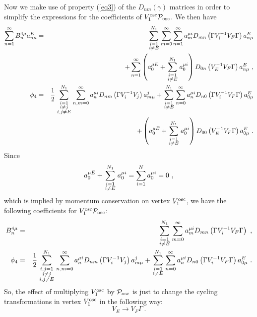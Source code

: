 \documentclass[a4paper,11pt]{article}
\begin{document}
Now we make use of property (\ref{eq3}) of the $D_{nm}(\gamma )$ matrices in order to simplify the expressions for the coefficients of $V^{\rm osc}_1{\cal P}_{\rm osc}$. We then have
\begin{eqnarray}
\sum_{n=1}^\infty B^{4\mu }_na^E_{n\mu } & = & \sum_{\scriptstyle i=1\atop \scriptstyle i\neq E}^{N_1}\sum_{m=0}^\infty \sum_{n=1}^\infty a^{\mu i}_mD_{mn}\left( \Gamma V^{-1}_iV_F\Gamma \right) a^E_{n\mu } \nonumber \\ 
 & & +\sum_{n=1}^\infty \left( a^{\mu E}_0+\sum_{\scriptstyle i=1\atop \scriptstyle i\neq E}^{N_1}a^{\mu i}_0\right) D_{0n}\left( V^{-1}_EV_F\Gamma \right) a^E_{n\mu }\ ,\\ 
\phi _4& = & \frac{1}{2}\sum_{{\scriptstyle i=1\atop \scriptstyle i\neq j}\atop \scriptstyle i,j\neq E}^{N_1}\sum_{n,m=0}^\infty a^{\mu i}_nD_{nm}\left( \Gamma V^{-1}_iV_j\right) a^j_{m\mu } +\sum_{\scriptstyle i=1\atop \scriptstyle i\neq E}^{N_1}\sum_{n=0}^\infty a^{\mu i}_nD_{n0}\left( \Gamma V^{-1}_iV_F\Gamma \right) a^E_{0\mu }\nonumber \\ 
 & & +\left( a^{\mu E}_0+\sum_{\scriptstyle i=1\atop \scriptstyle i\neq E}^{N_1}a^{\mu i}_0\right) D_{00}\left( V^{-1}_EV_F\Gamma \right) a^E_{0\mu }\ .
\end{eqnarray}
Since
\begin{equation}
a^{\mu E}_0+\sum_{\scriptstyle i=1\atop \scriptstyle i\neq E}^{N_1}a^{\mu i}_0=\sum_{i=1}^Na^{\mu i}_0=0\ ,
\end{equation}
which is implied by momentum conservation on vertex $V^{\rm osc}_1$, we have the following coefficients for $V^{\rm osc}_1{\cal P}_{\rm osc}$:
\begin{eqnarray}
B^{4\mu }_n & = & \sum_{\scriptstyle i=1\atop \scriptstyle i\neq E}^{N_1}\sum_{m=0}^\infty a^{\mu i}_mD_{mn}\left( \Gamma V^{-1}_iV_F\Gamma \right) \ ,\\ 
\phi _4 & = & \frac{1}{2} \sum_{{\scriptstyle i,j=1\atop \scriptstyle i\neq j}\atop \scriptstyle i,j\neq E}^{N_1}\sum_{n,m=0}^\infty a^{\mu i}_nD_{nm}\left( \Gamma V^{-1}_iV_j\right) a^j_{m\mu } +\sum_{\scriptstyle i=1\atop \scriptstyle i\neq E}^{N_1}\sum_{n=0}^\infty a^{\mu i}_nD_{n0}\left( \Gamma V^{-1}_iV_F\Gamma \right) a^E_{0\mu }\ .
\end{eqnarray}
So, the effect of multiplying $V^{\rm osc}_1$ by ${\cal P}_{\rm osc}$ is just to change the cycling transformations in vertex $V^{\rm osc}_1$ in the following way:
\begin{equation}
V_E\longrightarrow V_F\Gamma \ .
\end{equation}
\end{document}
